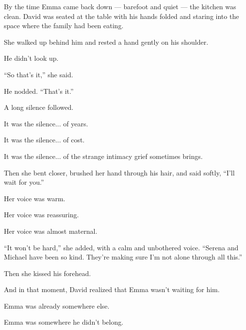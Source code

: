 By the time Emma came back down --- barefoot and quiet --- the kitchen was clean.
David was seated at the table with his hands folded and staring into the space where the
family had been eating.

She walked up behind him and rested a hand gently on his shoulder.

He didn’t look up.

``So that’s it,'' she said.

He nodded. ``That’s it.''

A long silence followed. 

It was the silence... of years. 

It was the silence... of cost. 

It was the silence... of the strange intimacy grief sometimes brings.

Then she bent closer, brushed her hand through his hair, and said softly,  
``I’ll wait for you.''

Her voice was warm. 

Her voice was reassuring. 

Her voice was almost maternal.  

``It won’t be hard,'' she added, with a calm and unbothered voice.
``Serena and Michael have been so kind. They’re making sure I’m not alone through all this.''

Then she kissed his forehead.

And in that moment, David realized that 
Emma wasn’t waiting for him.  

Emma was already somewhere else.  

Emma was somewhere he didn't belong.

\medskip

